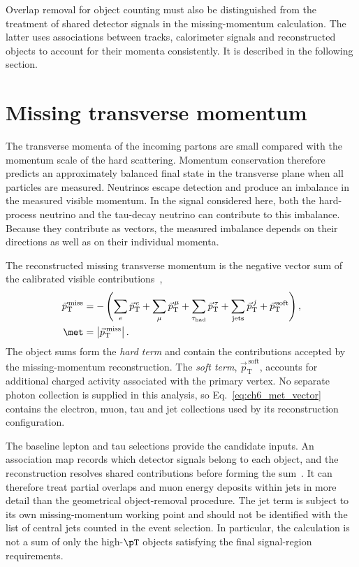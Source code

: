Overlap removal for object counting must also be distinguished from the treatment of shared detector signals in the missing-momentum calculation.
The latter uses associations between tracks, calorimeter signals and reconstructed objects to account for their momenta consistently.
It is described in the following section.

\section{Missing transverse momentum}
\label{sec:ch6_met}

The transverse momenta of the incoming partons are small compared with the momentum scale of the hard scattering.
Momentum conservation therefore predicts an approximately balanced final state in the transverse plane when all particles are measured.
Neutrinos escape detection and produce an imbalance in the measured visible momentum.
In the signal considered here, both the hard-process neutrino and the tau-decay neutrino can contribute to this imbalance.
Because they contribute as vectors, the measured imbalance depends on their directions as well as on their individual momenta.

The reconstructed missing transverse momentum is the negative vector sum of the calibrated visible contributions~\cite{ATLAS2025METPerformance},
\begin{align}
    \vec p_{\mathrm{T}}^{\,\mathrm{miss}}
    &= -\left(
        \sum_{e}\vec p_{\mathrm{T}}^{\,e}
        + \sum_{\mu}\vec p_{\mathrm{T}}^{\,\mu}
        + \sum_{\tau_{\mathrm{had}}}\vec p_{\mathrm{T}}^{\,\tau}
        + \sum_{\mathrm{jets}}\vec p_{\mathrm{T}}^{\,j}
        + \vec p_{\mathrm{T}}^{\,\mathrm{soft}}
       \right),
    \label{eq:ch6_met_vector}\\
    \met &= \left|\vec p_{\mathrm{T}}^{\,\mathrm{miss}}\right|.
    \label{eq:ch6_met_magnitude}
\end{align}
The object sums form the \emph{hard term} and contain the contributions accepted by the missing-momentum reconstruction.
The \emph{soft term}, $\vec p_{\mathrm{T}}^{\,\mathrm{soft}}$, accounts for additional charged activity associated with the primary vertex.
No separate photon collection is supplied in this analysis, so Eq.~\eqref{eq:ch6_met_vector} contains the electron, muon, tau and jet collections used by its reconstruction configuration.

The baseline lepton and tau selections provide the candidate inputs.
An association map records which detector signals belong to each object, and the reconstruction resolves shared contributions before forming the sum~\cite{ATLAS2025METPerformance}.
It can therefore treat partial overlaps and muon energy deposits within jets in more detail than the geometrical object-removal procedure.
The jet term is subject to its own missing-momentum working point and should not be identified with the list of central jets counted in the event selection.
In particular, the calculation is not a sum of only the high-$\pT$ objects satisfying the final signal-region requirements.

